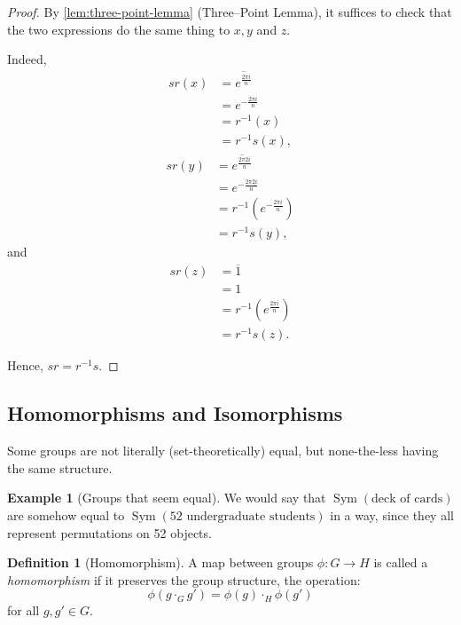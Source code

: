 \documentclass{article}
\theoremstyle{definition}
\newtheorem{definition}[theorem]{Definition}
\newtheorem*{example*}{Example}
\theoremstyle{remark}
\newcommand{\pqty}[1]{\left(#1\right)}
\newcommand{\functiondomain}[3]{#1:#2\to #3}
\newcommand{\conjugate}[1]{\overline{#1}}
\newcommand{\inverse}{^{-1}}
\newcommand{\Sym}{\operatorname{Sym}}
\begin{document}
\begin{proof}
    By \autoref{lem:three-point-lemma} (Three--Point Lemma), it suffices to check that the two expressions do the same thing to \(x, y\) and \(z\).

    Indeed,
    \begin{align*}
        sr\pqty{x} &= \conjugate{e^{\frac{2 \pi i}{n}}} \\
        &= e^{-\frac{2 \pi i}{n}} \\
        &= r\inverse \pqty{x} \\
        &= r\inverse s \pqty{x},
    \end{align*}
    \begin{align*}
        sr\pqty{y} &= \conjugate{e^{\frac{2 \pi 2 i}{n}}} \\
        &= e^{-\frac{2 \pi 2 i}{n}} \\
        &= r\inverse \pqty{e^{- \frac{2 \pi i}{n}}} \\
        &= r\inverse s \pqty{y},
    \end{align*}
    and
    \begin{align*}
        sr\pqty{z} &= \conjugate{1} \\
        &= 1 \\
        &= r\inverse \pqty{e^{\frac{2 \pi i}{n}}} \\
        &= r\inverse s \pqty{z}.
    \end{align*}

    Hence, \(sr = r\inverse s\).
\end{proof}

\subsection{Homomorphisms and Isomorphisms}
\label{sec:homomorphism-isomorphism}

Some groups are not literally (set-theoretically) equal, but none-the-less having the same structure.

\begin{example*}[Groups that seem equal]
    We would say that \(\Sym\pqty{\text{deck of cards}}\) are somehow equal to \(\Sym\pqty{\text{52 undergraduate students}}\) in a way, since they all represent permutations on 52 objects.
\end{example*}

\begin{definition}[Homomorphism]
    \label{def:homomorphism}%
    A map between groups \(\functiondomain{\phi}{G}{H}\) is called a \emph{homomorphism} if it preserves the group structure, the operation:
    \[
        \phi\pqty{g \cdot_{G} g'} = \phi\pqty{g} \cdot_{H} \phi\pqty{g'}
    \]
    for all \(g, g' \in G\).
\end{definition}
\end{document}
